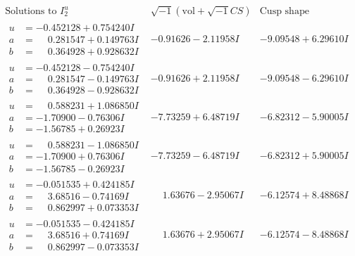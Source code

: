 \documentclass[1p]{elsarticle_modified}
\theoremstyle{definition}
\newcommand{\I}{\sqrt{-1}}
\begin{document}
$$\begin{array}{c|c|c}  
\text{Solutions to }I^u_{2}& \I (\text{vol} + \sqrt{-1}CS) & \text{Cusp shape}\\
 \hline 
\begin{aligned}
u &= -0.452128 + 0.754240 I \\
a &= \phantom{-}0.281547 + 0.149763 I \\
b &= \phantom{-}0.364928 + 0.928632 I\end{aligned}
 & -0.91626 - 2.11958 I & -9.09548 + 6.29610 I \\ \hline\begin{aligned}
u &= -0.452128 - 0.754240 I \\
a &= \phantom{-}0.281547 - 0.149763 I \\
b &= \phantom{-}0.364928 - 0.928632 I\end{aligned}
 & -0.91626 + 2.11958 I & -9.09548 - 6.29610 I \\ \hline\begin{aligned}
u &= \phantom{-}0.588231 + 1.086850 I \\
a &= -1.70900 - 0.76306 I \\
b &= -1.56785 + 0.26923 I\end{aligned}
 & -7.73259 + 6.48719 I & -6.82312 - 5.90005 I \\ \hline\begin{aligned}
u &= \phantom{-}0.588231 - 1.086850 I \\
a &= -1.70900 + 0.76306 I \\
b &= -1.56785 - 0.26923 I\end{aligned}
 & -7.73259 - 6.48719 I & -6.82312 + 5.90005 I \\ \hline\begin{aligned}
u &= -0.051535 + 0.424185 I \\
a &= \phantom{-}3.68516 - 0.74169 I \\
b &= \phantom{-}0.862997 + 0.073353 I\end{aligned}
 & \phantom{-}1.63676 - 2.95067 I & -6.12574 + 8.48868 I \\ \hline\begin{aligned}
u &= -0.051535 - 0.424185 I \\
a &= \phantom{-}3.68516 + 0.74169 I \\
b &= \phantom{-}0.862997 - 0.073353 I\end{aligned}
 & \phantom{-}1.63676 + 2.95067 I & -6.12574 - 8.48868 I \\ \hline\begin{aligned}

\end{aligned}
\end{array}$$
\end{document}
